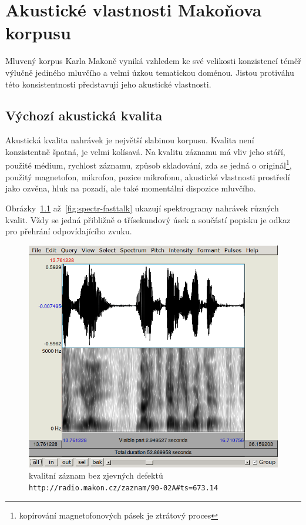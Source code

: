 \chapter{Akustické vlastnosti Makoňova korpusu}
\label{kap:akustika}

Mluvený korpus Karla Makoně vyniká vzhledem ke své velikosti konzistencí téměř
výlučně jediného mluvčího a velmi úzkou tematickou doménou. Jistou protiváhu
této konsistentnosti představují jeho akustické vlastnosti.

\section{Výchozí akustická kvalita}

Akustická kvalita nahrávek je největší slabinou korpusu. Kvalita není
konzistentně špatná, je velmi kolísavá. Na kvalitu záznamu má vliv jeho stáří,
použité médium, rychlost záznamu, způsob skladování, zda se jedná o
originál\footnote{kopírování magnetofonových pásek je ztrátový proces}, použitý
magnetofon, mikrofon, pozice mikrofonu, akustické vlastnosti prostředí jako
ozvěna, hluk na pozadí, ale také momentální dispozice mluvčího.

Obrázky~\ref{fig:spectr-ok} až~\ref{fig:spectr-fasttalk} ukazují spektrogramy
nahrávek různých kvalit. Vždy se jedná přibližně o třísekundový úsek a součástí
popisku je odkaz pro přehrání odpovídajícího zvuku.

\begin{figure}[htpb]
\includegraphics[scale=0.89]{rc/spectrum-dobry-90-02A.png}
\caption{
    kvalitní záznam bez zjevných defektů\\
    \texttt{http://radio.makon.cz/zaznam/90-02A\#ts=673.14}
}
\label{fig:spectr-ok}
\end{figure}


